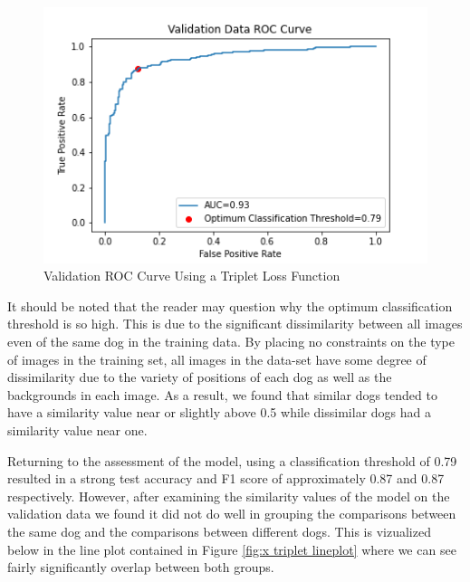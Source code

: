 \documentclass{article}
\begin{document}
\begin{figure}[h]
\centering
	\includegraphics[scale=0.7]{final-report-images/roc_curve_validation_triplet.png}
\caption{Validation ROC Curve Using a Triplet Loss Function}
\label{fig:x val roc curve}
\end{figure}

\noindent It should be noted that the reader may question why the optimum classification threshold is so high.  This is due to the significant dissimilarity between all images even of the same dog in the training data.  By placing no constraints on the type of images in the training set, all images in the data-set have some degree of dissimilarity due to the variety of positions of each dog as well as the backgrounds in each image.  As a result, we found that similar dogs tended to have a similarity value near or slightly above 0.5 while dissimilar dogs had a similarity value near one.  

Returning to the assessment of the model, using a classification threshold of 0.79 resulted in a strong test accuracy and F1 score of approximately 0.87 and 0.87 respectively.  However, after examining the similarity values of the model on the validation data we found it did not do well in grouping the comparisons between the same dog and the comparisons between different dogs.  This is vizualized below in the line plot contained in Figure \ref{fig:x triplet lineplot} where we can see fairly significantly overlap between both groups.
\end{document}
